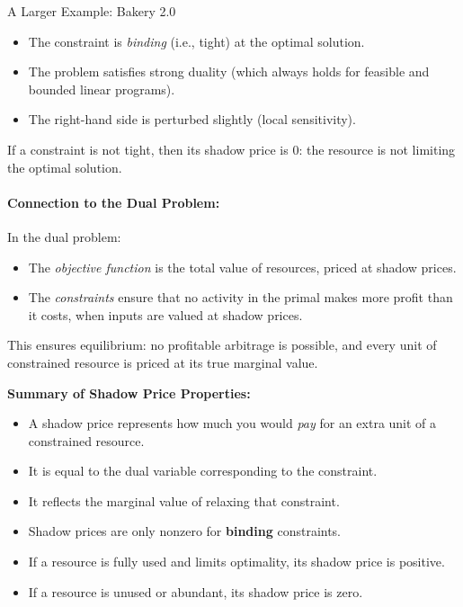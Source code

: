 \begin{example}{A Larger Example: Bakery 2.0}{}
\begin{itemize}
\item The constraint is \emph{binding} (i.e., tight) at the optimal solution.
\item The problem satisfies strong duality (which always holds for feasible and bounded linear programs).
\item The right-hand side is perturbed slightly (local sensitivity).
\end{itemize}

If a constraint is not tight, then its shadow price is 0: the resource is not limiting the optimal solution.

\vspace{1em}
\paragraph{Connection to the Dual Problem:}
In the dual problem:
\begin{itemize}
\item The \emph{objective function} is the total value of resources, priced at shadow prices.
\item The \emph{constraints} ensure that no activity in the primal makes more profit than it costs, when inputs are valued at shadow prices.
\end{itemize}
This ensures equilibrium: no profitable arbitrage is possible, and every unit of constrained resource is priced at its true marginal value.

\vspace{1em}
\noindent\textbf{Summary of Shadow Price Properties:}
\begin{itemize}
\item A shadow price represents how much you would \emph{pay} for an extra unit of a constrained resource.
\item It is equal to the dual variable corresponding to the constraint.
\item It reflects the marginal value of relaxing that constraint.
\item Shadow prices are only nonzero for \textbf{binding} constraints.
\end{itemize}

\vspace{0.5em}

\begin{itemize}
\item If a resource is fully used and limits optimality, its shadow price is positive.
\item If a resource is unused or abundant, its shadow price is zero.
\end{itemize}
\end{example}

